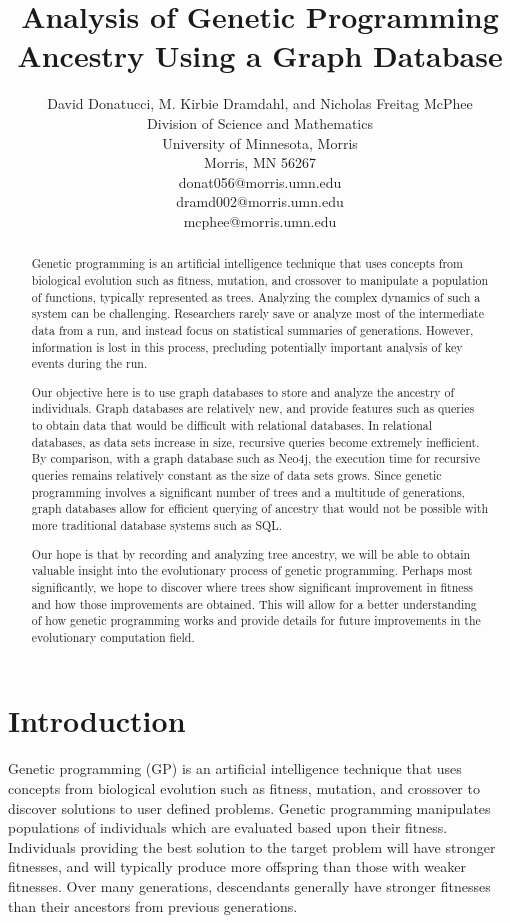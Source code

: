 \documentclass[12pt]{article}
\title{Analysis of Genetic Programming Ancestry Using a Graph Database}
\author{
 		David Donatucci, M. Kirbie Dramdahl, and Nicholas Freitag McPhee\\
        Division of Science and Mathematics\\
        University of Minnesota, Morris\\
        Morris, MN 56267\\
        donat056@morris.umn.edu\\
        dramd002@morris.umn.edu\\
        mcphee@morris.umn.edu\\
}
\date{}
\begin{document}
\pagestyle{plain}

\maketitle

\begin{abstract}

Genetic programming is an artificial intelligence technique that uses concepts from biological evolution such as fitness, mutation, and crossover to manipulate a population of functions, typically represented as trees. Analyzing the complex dynamics of such a system can be challenging. Researchers rarely save or analyze most of the intermediate data from a run, and instead focus on statistical summaries of generations. However, information is lost in this process, precluding potentially important analysis of key events during the run.

Our objective here is to use graph databases to store and analyze the ancestry of individuals. Graph databases are relatively new, and provide features such as queries to obtain data that would be difficult with relational databases. In relational databases, as data sets increase in size, recursive queries become extremely inefficient. By comparison, with a graph database such as Neo4j, the execution time for recursive queries remains relatively constant as the size of data sets grows. Since genetic programming involves a significant number of trees and a multitude of generations, graph databases allow for efficient querying of ancestry that would not be possible with more traditional database systems such as SQL.

Our hope is that by recording and analyzing tree ancestry, we will be able to obtain valuable insight into the evolutionary process of genetic programming. Perhaps most significantly, we hope to discover where trees show significant improvement in fitness and how those improvements are obtained. This will allow for a better understanding of how genetic programming works and provide details for future improvements in the evolutionary computation field.

\end{abstract}

\section{Introduction} \label{sec:intro}

Genetic programming (GP) is an artificial intelligence technique that uses concepts from biological evolution such as fitness, mutation, and crossover to discover solutions to user defined problems. Genetic programming manipulates populations of individuals which are evaluated based upon their fitness. Individuals providing the best solution to the target problem will have stronger fitnesses, and will typically produce more offspring than those with weaker fitnesses. Over many generations, descendants generally have stronger fitnesses than their ancestors from previous generations.
\end{document}
